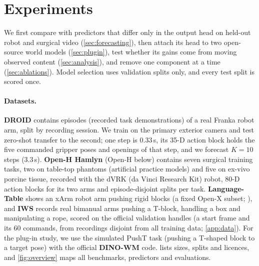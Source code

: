 \section{Experiments}
\label{sec:experiments}
\label{sec:setup}

We first compare \ours{} with predictors that differ only in the output head on held-out robot and surgical video
(\cref{sec:forecasting}), then attach its head to two open-source world models (\cref{sec:plugin}), test whether its
gains come from moving observed content (\cref{sec:analysis}), and remove one component at a time
(\cref{sec:ablations}).
%
Model selection uses validation splits only, and every test split is scored once.

\paragraph{Datasets.}
\textbf{DROID} \citep{khazatsky2024droid} contains episodes (recorded task demonstrations) of a real Franka
robot arm, split by recording session.
%
We train on the primary exterior camera and test zero-shot transfer to the second; one step is 0.33\,s, its 35-D
action block holds the five commanded gripper poses and openings of that step, and we forecast $K{=}10$ steps (3.3\,s).
%
\textbf{Open-H Hamlyn} (Open-H below) \citep{openh2026embodiment} contains seven surgical training tasks, two on table-top phantoms (artificial practice models) and five on
ex-vivo porcine tissue, recorded with the dVRK (da Vinci Research Kit) robot, 80-D action blocks for its two arms and episode-disjoint splits per task.
%
\textbf{Language-Table} \citep{lynch2023interactive} shows an xArm robot arm pushing rigid blocks (a fixed Open-X
subset; \citealp{oneill2024openx}), and \textbf{IWS} \citep{wang2026iws,zhang2026rlawm} records real bimanual arms pushing a
T-block, handling a box and manipulating a rope, scored on the official validation handles (a start frame and its 60 commands, from recordings disjoint from all training data; \cref{app:data}).
%
For the plug-in study, we use the simulated PushT task (pushing a T-shaped block to a target pose) with the official
\textbf{DINO-WM} code.
%
 lists sizes, splits and licences, and \cref{fig:overview} maps all benchmarks, predictors and evaluations.


